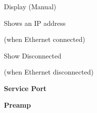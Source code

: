 \documentclass{article}
\begin{document}
\begin{minipage}[t]{0.46\textwidth}
  \begin{checklist}
    \item Display (Manual)
    \begin{checklist}
      \item Shows an IP address \item[] (when Ethernet connected)
      \item Show Disconnected \item[] (when Ethernet disconnected)
    \end{checklist}
    \item \textbf{Service Port}
  \end{checklist}
\end{minipage}
\hspace{0.01\textwidth}
\begin{minipage}[t]{0.52\textwidth}
  \begin{checklist}
    \item \textbf{Preamp}
  \end{checklist}


\end{minipage}
\end{document}
